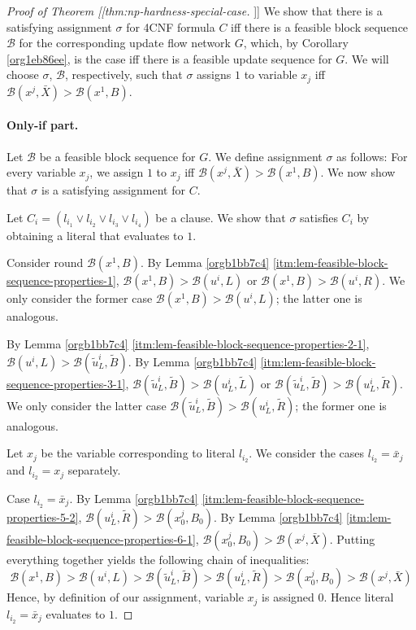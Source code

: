 \documentclass[fontsize=11pt,paper=a4]{book}
\begin{document}
\begin{proof}[Proof of Theorem [[thm:np-hardness-special-case]]]
We show that there is a satisfying assignment \(\sigma\) for 4CNF formula \(C\) iff there is a feasible block sequence \(\mathcal{B}\) for the corresponding update flow network \(G\), which, by Corollary \ref{org1eb86ee}, is the case iff there is a feasible update sequence for \(G\).
We will choose \(\sigma\), \(\mathcal{B}\), respectively, such that \(\sigma\) assigns \(1\) to variable \(x_j\) iff \(\mathcal{B}(x^j,\bar{X})>\mathcal{B}(x^1,B)\).

\paragraph{Only-if part.}
Let \(\mathcal{B}\) be a feasible block sequence for \(G\).
We define assignment \(\sigma\) as follows:
For every variable \(x_j\), we assign \(1\) to \(x_j\) iff \(\mathcal{B}(x^j,\bar{X})>\mathcal{B}(x^1,B)\).
We now show that \(\sigma\) is a satisfying assignment for \(C\).

Let \(C_i=(l_{i_1}\vee l_{i_2}\vee l_{i_3}\vee l_{i_4})\) be a clause.
We show that \(\sigma\) satisfies \(C_i\) by obtaining a literal that evaluates to \(1\).

Consider round \(\mathcal{B}(x^1,B)\).
By Lemma \ref{orgb1bb7c4} \ref{itm:lem-feasible-block-sequence-properties-1}, \(\mathcal{B}(x^1,B)>\mathcal{B}(u^i,L)\) or \(\mathcal{B}(x^1,B)>\mathcal{B}(u^i,R)\).
We only consider the former case \(\mathcal{B}(x^1,B)>\mathcal{B}(u^i,L)\); the latter one is analogous.

By Lemma \ref{orgb1bb7c4} \ref{itm:lem-feasible-block-sequence-properties-2-1}, \(\mathcal{B}(u^i,L)>\mathcal{B}(\tilde{u}_L^i,\tilde{B})\).
By Lemma \ref{orgb1bb7c4} \ref{itm:lem-feasible-block-sequence-properties-3-1}, \(\mathcal{B}(\tilde{u}_L^i,\tilde{B})>\mathcal{B}(u_L^i,\tilde{L})\) or \(\mathcal{B}(\tilde{u}_L^i,\tilde{B})>\mathcal{B}(u_L^i,\tilde{R})\).
We only consider the latter case \(\mathcal{B}(\tilde{u}_L^i,\tilde{B})>\mathcal{B}(u_L^i,\tilde{R})\); the former one is analogous.

Let \(x_j\) be the variable corresponding to literal \(l_{i_2}\).
We consider the cases \(l_{i_2}=\bar{x}_j\) and \(l_{i_2}=x_j\) separately.

Case \(l_{i_2}=\bar{x}_j\).
By Lemma \ref{orgb1bb7c4} \ref{itm:lem-feasible-block-sequence-properties-5-2}, \(\mathcal{B}(u_L^i,\tilde{R})>\mathcal{B}(x_0^j,B_0)\).
By Lemma \ref{orgb1bb7c4} \ref{itm:lem-feasible-block-sequence-properties-6-1}, \(\mathcal{B}(x_0^j,B_0)>\mathcal{B}(x^j,\bar{X})\).
Putting everything together yields the following chain of inequalities:
\[
\mathcal{B}(x^1,B)>
\mathcal{B}(u^i,L)>
\mathcal{B}(\tilde{u}_L^i,\tilde{B})>
\mathcal{B}(u_L^i,\tilde{R})>
\mathcal{B}(x_0^j,B_0)>
\mathcal{B}(x^j,\bar{X})
\]
Hence, by definition of our assignment, variable \(x_j\) is assigned \(0\).
Hence literal \(l_{i_2}=\bar{x}_j\) evaluates to \(1\).


\end{proof}
\end{document}
